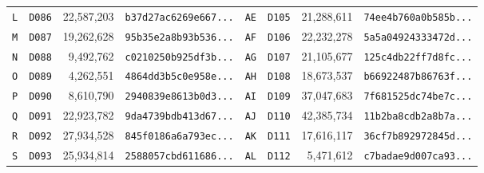 \documentclass[twocolumn,10pt]{article}
\begin{document}
\begin{table}[!ht]
{\begin{tabular}{llrl|llrl}
\texttt{L} & \texttt{D086} & 22,587,203 & \texttt{b37d27ac6269e667...} & \texttt{AE} & \texttt{D105} & 21,288,611 & \texttt{74ee4b760a0b585b...} \\
\texttt{M} & \texttt{D087} & 19,262,628 & \texttt{95b35e2a8b93b536...} & \texttt{AF} & \texttt{D106} & 22,232,278 & \texttt{5a5a04924333472d...} \\
\texttt{N} & \texttt{D088} & 9,492,762 & \texttt{c0210250b925df3b...} & \texttt{AG} & \texttt{D107} & 21,105,677 & \texttt{125c4db22ff7d8fc...} \\
\texttt{O} & \texttt{D089} & 4,262,551 & \texttt{4864dd3b5c0e958e...} & \texttt{AH} & \texttt{D108} & 18,673,537 & \texttt{b66922487b86763f...} \\
\texttt{P} & \texttt{D090} & 8,610,790 & \texttt{2940839e8613b0d3...} & \texttt{AI} & \texttt{D109} & 37,047,683 & \texttt{7f681525dc74be7c...} \\
\texttt{Q} & \texttt{D091} & 22,923,782 & \texttt{9da4739bdb413d67...} & \texttt{AJ} & \texttt{D110} & 42,385,734 & \texttt{11b2ba8cdb2a8b7a...} \\
\texttt{R} & \texttt{D092} & 27,934,528 & \texttt{845f0186a6a793ec...} & \texttt{AK} & \texttt{D111} & 17,616,117 & \texttt{36cf7b892972845d...} \\
\texttt{S} & \texttt{D093} & 25,934,814 & \texttt{2588057cbd611686...} & \texttt{AL} & \texttt{D112} & 5,471,612 & \texttt{c7badae9d007ca93...} \\
\bottomrule
\end{tabular}%
}
\end{table}

\clearpage
\end{document}
